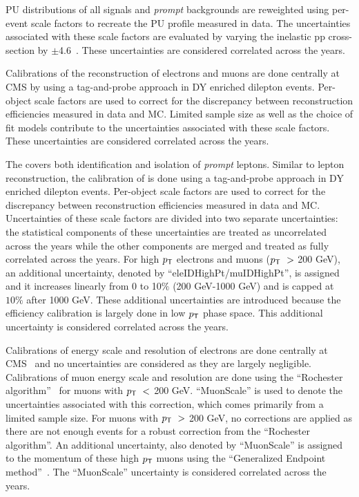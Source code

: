 \ac{PU} distributions of all signals and \emph{prompt} backgrounds are reweighted using per-event scale factors to recreate the \ac{PU} profile measured in data. The uncertainties associated with these scale factors are evaluated by varying the inelastic pp cross-section by $\pm$4.6~\cite{Sirunyan:2018nqx}. These uncertainties are considered correlated across the years.

Calibrations of the reconstruction of electrons and muons are done centrally at \ac{CMS} by using a tag-and-probe approach in DY enriched dilepton events. Per-object scale factors are used to correct for the discrepancy between reconstruction efficiencies measured in data and \ac{MC}. Limited sample size as well as the choice of fit models contribute to the uncertainties associated with these scale factors. These uncertainties are considered correlated across the years.

The \TOP covers both identification and isolation of \emph{prompt} leptons. Similar to lepton reconstruction, the calibration of \TOP is done using a tag-and-probe approach in DY enriched dilepton events. Per-object scale factors are used to correct for the discrepancy between reconstruction efficiencies measured in data and \ac{MC}. Uncertainties of these scale factors are divided into two separate uncertainties: the statistical components of these uncertainties are treated as uncorrelated across the years while the other components are merged and treated as fully correlated across the years. For high $p_{\textsf{T}}$ electrons and muons ($p_{\textsf{T}}~>$ 200 GeV), an additional uncertainty, denoted by ``eleIDHighPt/muIDHighPt'', is assigned and it increases linearly from 0 to 10$\%$ (200 GeV-1000 GeV) and is capped at $10\%$ after 1000 GeV. These additional uncertainties are introduced because the efficiency calibration is largely done in low $p_{\textsf{T}}$ phase space. This additional uncertainty is considered correlated across the years.

Calibrations of energy scale and resolution of electrons are done centrally at CMS~\cite{CMS:2013lxn} and no uncertainties are considered as they are largely negligible. Calibrations of muon energy scale and resolution are done using the ``Rochester algorithm''~\cite{Bodek:2012id} for muons with $p_{\textsf{T}}~<$ 200 GeV. ``MuonScale'' is used to denote the uncertainties associated with this correction, which comes primarily from a limited sample size. For muons with $p_{\textsf{T}}~>$ 200 GeV, no corrections are applied as there are not enough events for a robust correction from the ``Rochester algorithm''. An additional uncertainty, also denoted by ``MuonScale'' is assigned to the momentum of these high $p_{\textsf{T}}$ muons using the ``Generalized Endpoint method''~\cite{CMS:2018rym}. The ``MuonScale'' uncertainty is considered correlated across the years.

